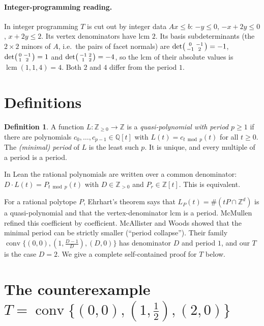 \documentclass[11pt]{article}
\theoremstyle{definition}
\newtheorem{definition}[theorem]{Definition}
\theoremstyle{remark}
\newcommand{\Z}{\mathbb Z}
\newcommand{\Q}{\mathbb Q}
\newcommand{\conv}{\operatorname{conv}}
\newcommand{\lcm}{\operatorname{lcm}}
\begin{document}
\paragraph{Integer-programming reading.} In integer programming $T$ is cut out by integer data
$Ax\le b$: $-y\le0$, $-x+2y\le0$, $x+2y\le2$. Its vertex denominators have lcm $2$. Its basis
subdeterminants (the $2\times2$ minors of $A$, i.e.\ the pairs of facet normals) are
$\det\begin{psmallmatrix}0&-1\\-1&2\end{psmallmatrix}=-1$,
$\det\begin{psmallmatrix}0&-1\\1&2\end{psmallmatrix}=1$ and
$\det\begin{psmallmatrix}-1&2\\1&2\end{psmallmatrix}=-4$, so the lcm of their absolute values
is $\lcm(1,1,4)=4$. Both $2$ and $4$ differ from the period $1$.

\section{Definitions}

\begin{definition}
A function $L:\Z_{\ge0}\to\Z$ is a \emph{quasi-polynomial with period $p\ge1$} if there are
polynomials $c_0,\dots,c_{p-1}\in\Q[t]$ with $L(t)=c_{t\bmod p}(t)$ for all $t\ge0$. The
\emph{(minimal) period} of $L$ is the least such $p$. It is unique, and every multiple of a period is a period.
\end{definition}

In Lean the rational polynomials are written over a common denominator: $D\cdot L(t)=P_{t\bmod
p}(t)$ with $D\in\Z_{>0}$ and $P_r\in\Z[t]$. This is equivalent.

For a rational polytope $P$, Ehrhart's theorem \cite{Ehr} says that $L_P(t)=\#(tP\cap\Z^d)$ is a
quasi-polynomial and that the vertex-denominator lcm is a period. McMullen \cite{McM} refined
this coefficient by coefficient. McAllister and Woods \cite{MW} showed that the minimal period can be
strictly smaller (``period collapse''). Their family
$\conv\{(0,0),(1,\frac{D-1}{D}),(D,0)\}$ has denominator $D$ and period $1$, and our $T$ is the
case $D=2$. We give a complete self-contained proof for $T$ below.

\section{\texorpdfstring{The counterexample $T=\conv\{(0,0),(1,\frac12),(2,0)\}$}{The counterexample T}}
\label{sec:T}
\end{document}
